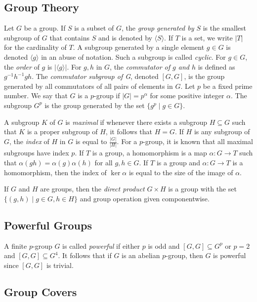 \documentclass{amsart}
\numberwithin{equation} {section}
\theoremstyle{definition}
\begin{document}
\subsection{Group Theory}

Let $G$ be a group. If $S$ is a subset of $G$, the \textit{group generated by $S$} is the smallest subgroup of $G$ that contains $S$ and is denoted by $\langle S \rangle$. If $T$ is a set, we write $|T|$ for the cardinality of $T$. A subgroup generated by a single element $g \in G$ is denoted $\langle g \rangle$ in an abuse of notation. Such a subgroup is called \textit{cyclic}. For $g \in G$, the \textit{order} of $g$ is $|\langle g \rangle|$.  For $g,h$ in $G$, the \textit{commutator of $g$ and $h$} is defined as $g^{-1}h^{-1}gh$. The \textit{commutator subgroup of G}, denoted $[G,G]$, is the group generated by all commutators of all pairs of elements in $G$. Let $p$ be a fixed prime number. We say that $G$ is a $p$-group if $|G| = p^\alpha$ for some positive integer $\alpha$. The subgroup $G^p$ is the group generated by the set $\{ g^p \mid g \in G \}$.

A subgroup $K$ of $G$ is \textit{maximal} if whenever there exists a subgroup $H \subseteq G$ such that $K$ is a proper subgroup of $H$, it follows that $H = G$. If $H$ is any subgroup of $G$, the \textit{index} of $H$ in $G$ is equal to $\displaystyle\frac{|G|}{|H|}.$ For a $p$-group, it is known that all maximal subgroups have index $p$. If $T$ is a group, a homomorphism is a map $\alpha: G \rightarrow T$ such that $\alpha(gh) = \alpha(g)\alpha(h)$ for all $g, h \in G$. If $T$ is a group and $\alpha: G \rightarrow T$ is a homomorphism, then the index of $\ker \alpha$ is equal to the size of the image of $\alpha$. 

If $G$ and $H$ are groups, then the \textit{direct product} $G \times H$ is a group with the set $\{ (g,h) \mid g \in G, h \in H \} $ and group operation given componentwise.

\subsection{Powerful Groups}

A finite $p$-group $G$ is called \textit{powerful} if either $p$ is odd and $[G,G]\subseteq G^p$ or $p=2$ and $[G,G]\subseteq G^4$. It follows that if $G$ is an abelian $p$-group, then $G$ is powerful since $[G,G]$ is trivial.  

\subsection{Group Covers}
\end{document}
